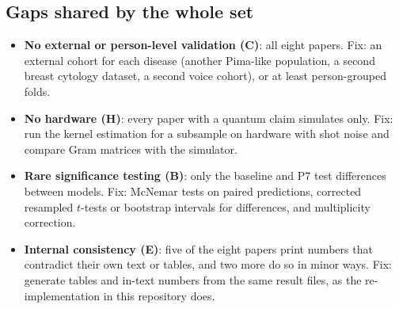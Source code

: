 \documentclass[11pt,a4paper]{article}
\begin{document}
\subsection{Gaps shared by the whole set}
\begin{itemize}
  \item \textbf{No external or person-level validation (C)}: all eight papers. Fix: an external cohort for each disease (another Pima-like population, a second breast cytology dataset, a second voice cohort), or at least person-grouped folds.
  \item \textbf{No hardware (H)}: every paper with a quantum claim simulates only. Fix: run the kernel estimation for a subsample on hardware with shot noise and compare Gram matrices with the simulator.
  \item \textbf{Rare significance testing (B)}: only the baseline and P7 test differences between models. Fix: McNemar tests on paired predictions, corrected resampled $t$-tests or bootstrap intervals for differences, and multiplicity correction.
  \item \textbf{Internal consistency (E)}: five of the eight papers print numbers that contradict their own text or tables, and two more do so in minor ways. Fix: generate tables and in-text numbers from the same result files, as the re-implementation in this repository does.
\end{itemize}
\end{document}
